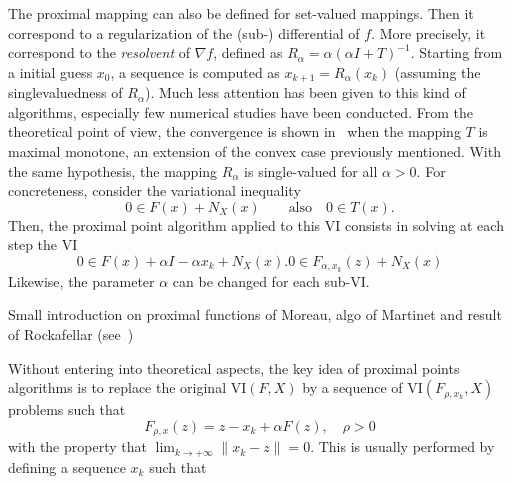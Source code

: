 The proximal mapping can also be defined for set-valued mappings.
Then it correspond to a regularization of the (sub-) differential of $f$.
More precisely, it correspond to the \emph{resolvent} of $\nabla f$,
defined as $R_\alpha=\alpha(\alpha I + T)^{-1}$.
Starting from a initial guess $x_0$, a sequence is computed as $x_{k+1} = R_\alpha(x_k)$
(assuming the singlevaluedness of $R_\alpha$).
Much less attention has been given to this kind of algorithms,
especially few numerical studies have been conducted.
From the theoretical point of view, the convergence is shown in~\citep{rockafellar1976monotone} when
the mapping $T$ is maximal monotone, an extension of the convex case previously mentioned.
With the same hypothesis, the mapping $R_\alpha$ is single-valued for all $\alpha>0$.
For concreteness, consider the variational inequality
\begin{equation}
 0 \in F(x) + N_X(x)\qquad\text{also} \quad 0\in T(x).
\end{equation}
Then, the proximal point algorithm applied to this VI consists in solving at each step the VI
\begin{equation}
 0 \in F(x) + \alpha I - \alpha x_k + N_X(x).
 0\in F_{\alpha,x_k}(z) + N_X(x)
\end{equation}
Likewise, the parameter $\alpha$ can be changed for each sub-VI.


\begin{ndrva}

  Small introduction on proximal functions of Moreau, algo of Martinet
  and result of Rockafellar (see~\cite{Chen.Teboublle_SIOPT1993})
\end{ndrva}

Without entering into theoretical aspects, the key idea of proximal points algorithms is to replace the original $\mathrm{VI}(F,X)$ by a sequence of $\mathrm{VI}(F_{\rho,x_k},X)$  problems such that 
\begin{equation}
  \label{eq:prox-algo-1}
  F_{\rho,x}(z) = z - x_k+ \alpha F(z) , \quad \rho > 0 
\end{equation}
with the property that $\lim_{ k \rightarrow +\infty} \| x_k -z \| = 0$. This is usually performed by defining a sequence $x_k$ such that
\fi

